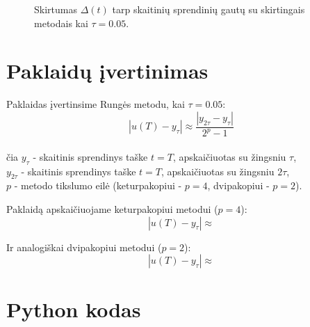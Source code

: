 \documentclass[]{VUMIFTemplateClass}
\newcommand{\ttwo}{0.05}
\begin{document}
\begin{figure}[H]
    \begin{center}
        
    \end{center}
    \caption{Skirtumas $\Delta(t)$ tarp skaitinių sprendinių gautų su skirtingais metodais kai $\tau = \ttwo$.}
\end{figure}

\section{Paklaidų įvertinimas}
Paklaidas įvertinsime Rungės metodu, kai $\tau = \ttwo$:
\[ |u(T) - y_{\tau}| \approx \frac{|y_{2 \tau} - y_{\tau}|}{2^p - 1} \]\\
čia $y_{\tau}$ - skaitinis sprendinys taške $t = T$, apskaičiuotas su žingsniu $\tau$,\\
$y_{2 \tau}$ - skaitinis sprendinys taške $t = T$, apskaičiuotas su žingsniu $2 \tau$,\\
$p$ - metodo tikslumo eilė (keturpakopiui - $p = 4$, dvipakopiui - $p = 2$).

\vspace{1.2cm}
Paklaidą apskaičiuojame keturpakopiui metodui ($p = 4$):
\[ |u(T) - y_{\tau}| \approx  \]

Ir analogiškai dvipakopiui metodui ($p = 2$):
\[ |u(T) - y_{\tau}| \approx  \]

\section{Python kodas}

\end{document}
